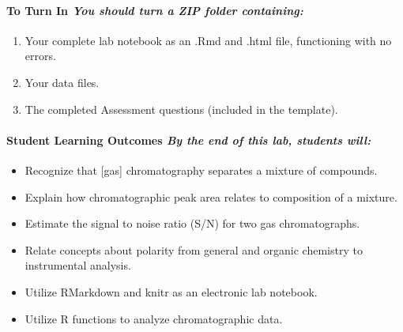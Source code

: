 \documentclass[]{tufte-book}
\providecommand{\tightlist}{%
  \setlength{\itemsep}{0pt}\setlength{\parskip}{0pt}}
\begin{document}
\hypertarget{to-turn-in-you-should-turn-a-zip-folder-containing}{%
\paragraph{\texorpdfstring{\textbf{To Turn In} \textbar{} \emph{You should turn a ZIP folder containing:}}{To Turn In \textbar{} You should turn a ZIP folder containing:}}\label{to-turn-in-you-should-turn-a-zip-folder-containing}}

\begin{enumerate}
\def\labelenumi{\arabic{enumi}.}
\tightlist
\item
  Your complete lab notebook as an .Rmd and .html file, functioning with no errors.\\
\item
  Your data files.\\
\item
  The completed Assessment questions (included in the template).
\end{enumerate}

\hypertarget{student-learning-outcomes-by-the-end-of-this-lab-students-will-1}{%
\paragraph{\texorpdfstring{\textbf{Student Learning Outcomes} \textbar{} \emph{By the end of this lab, students will:}}{Student Learning Outcomes \textbar{} By the end of this lab, students will:}}\label{student-learning-outcomes-by-the-end-of-this-lab-students-will-1}}

\begin{itemize}
\tightlist
\item
  Recognize that {[}gas{]} chromatography separates a mixture of compounds.\\
\item
  Explain how chromatographic peak area relates to composition of a mixture.\\
\item
  Estimate the signal to noise ratio (S/N) for two gas chromatographs.
\item
  Relate concepts about polarity from general and organic chemistry to instrumental analysis.\\
\item
  Utilize RMarkdown and knitr as an electronic lab notebook.
\item
  Utilize R functions to analyze chromatographic data.
\end{itemize}
\end{document}
